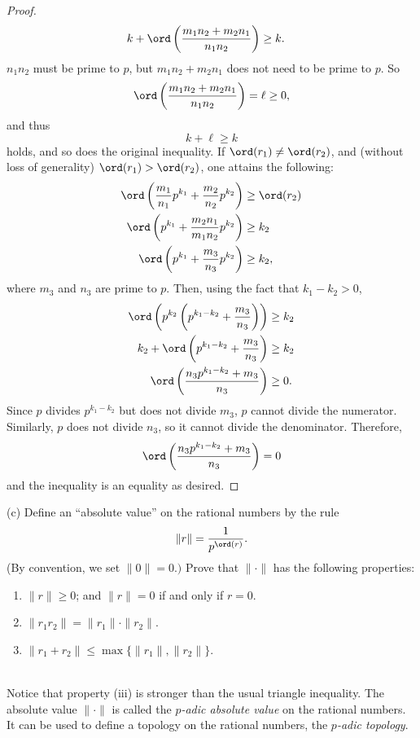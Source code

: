 \documentclass[11pt, oneside]{article}
\begin{document}
\begin{enumerate}
\begin{proof}
\begin{align*}
k+\ord\left(\frac{m_1n_2 + m_2n_1}{n_1n_2} \right) &\ge  k.
\end{align*}
$n_1n_2$ must be prime to $p$, but $m_1n_2 + m_2n_1$ does not need to be prime to $p$. So
$$
\ord\left(\frac{m_1n_2 + m_2n_1}{n_1n_2} \right) = \ell \ge  0,
$$
and thus
$$
k + \ell \ge  k
$$
holds, and so does the original inequality. If $\ord(r_1) \neq\ord(r_2)$, and (without loss of generality) $\ord(r_1) >\ord(r_2)$, one attains the following:
\begin{align*}
\ord\left(\frac{m_1}{n_1}p^{k_1} + \frac{m_2}{n_2}p^{k_2} \right) &\ge  \ord(r_2)\\
\ord\left(p^{k_1} + \frac{m_2n_1}{m_1n_2}p^{k_2} \right) &\ge  k_2\\
\ord\left(p^{k_1} + \frac{m_3}{n_3}p^{k_2} \right) &\ge  k_2,
\end{align*}
where $m_3$ and $n_3$ are prime to $p$. Then, using the fact that $k_1 - k_2 >0$,
\begin{align*}
\ord\left(p^{k_2}\left( p^{k_1-k_2} + \frac{m_3}{n_3}\right) \right) &\ge  k_2\\
k_2 + \ord\left( p^{k_1-k_2} + \frac{m_3}{n_3}\right) &\ge  k_2\\
\ord\left( \frac{n_3p^{k_1-k_2} + m_3}{n_3}\right) &\ge  0.
\end{align*}
Since $p$ divides $p^{k_1-k_2}$ but does not divide $m_3$, $p$ cannot divide the numerator. Similarly, $p$ does not divide $n_3$, so it cannot divide the denominator. Therefore,  
$$
\ord\left( \frac{n_3p^{k_1-k_2} + m_3}{n_3}\right) = 0
$$
and the inequality is an equality as desired.
\end{proof}
(c) Define an ``absolute value'' on the rational numbers by the rule 
$$
\|r\| = \frac{1}{p^{\ord(r)}}.
$$
(By convention, we set $\|0\|=0.)$ Prove that $\|\cdot\|$ has the following properties:\\
\begin{enumerate}[label = (\roman*)]
\item $\| r\| \ge  0$; and $\| r\| =0$ if and only if $r=0$.
\item $\|r_1r_2\| = \|r_1\| \cdot \|r_2\|$.
\item $\|r_1+r_2\| \le  \max\{   \|r_1\|,\|r_2\|  \}$.
\end{enumerate}
\textrm{}\\
Notice that property (iii) is stronger than the usual triangle inequality. The absolute value $\| \cdot\|$ is called the \textit{$p$-adic absolute value} on the rational numbers. It can be used to define a topology on the rational numbers, the \textit{$p$-adic topology}.

\end{enumerate}
\end{document}
